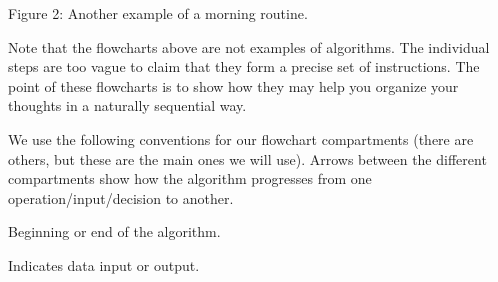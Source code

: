 \documentclass{ximera}
\begin{document}
\begin{center}
\end{center}
\begin{center}
	Figure 2: Another example of a morning routine.
\end{center}

Note that the flowcharts above are not examples of algorithms. The individual steps are too vague to claim that they form a precise set of instructions. The point of these flowcharts is to show how they may help you organize your thoughts in a naturally sequential way.

We use the following conventions for our flowchart compartments (there are others, but these are the main ones we will use). Arrows between the different compartments show how the algorithm progresses from one operation/input/decision to another.

\begin{center}
\end{center}
\begin{center}
	Beginning or end of the algorithm.
\end{center}

\begin{center}
\end{center}
\begin{center}
	Indicates data input or output.
\end{center}
\end{document}
